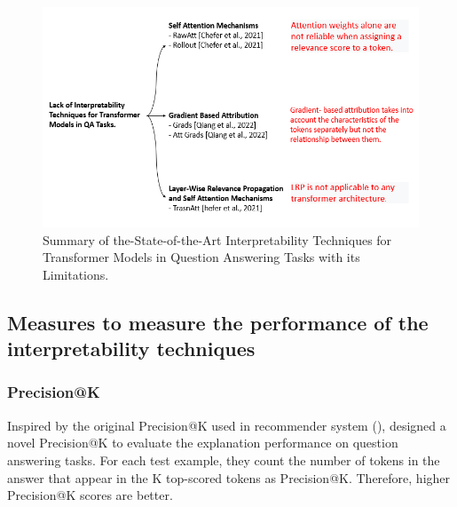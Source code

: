 \newpage

\begin{figure}[h!]
    \centering%
    \includegraphics[width=\linewidth]{Figures/Preliminares/SOTA.png}
    \caption{Summary of the-State-of-the-Art Interpretability Techniques for Transformer Models in Question Answering Tasks with its Limitations.}
    \label{fig:sota}
\end{figure}




\subsection{Measures to measure the performance of the interpretability techniques}

\subsubsection{Precision@K}

Inspired by the original Precision@K used in recommender system (\cite{thayaparan2020explanationlp}), \cite{NEURIPS2022_20e45668} designed
a novel Precision@K to evaluate the explanation performance on question answering tasks. For each test example, they count the number of tokens in the answer that appear in the K top-scored tokens as Precision@K. Therefore, higher Precision@K scores are better.


